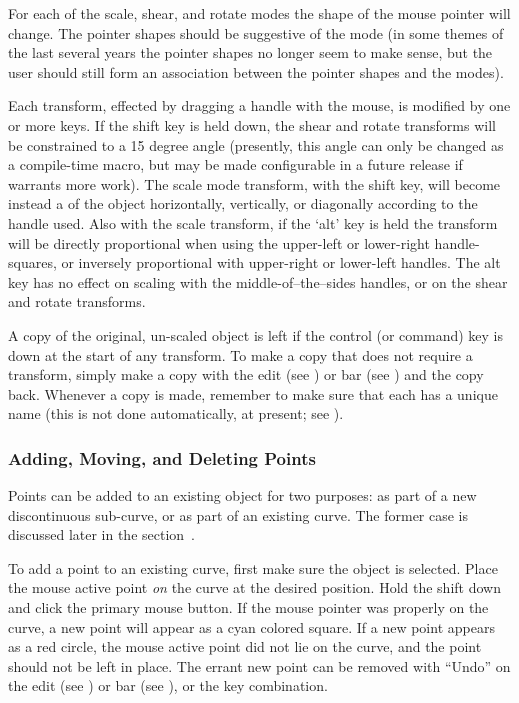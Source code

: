 			For each of the
			scale, shear, and rotate modes the shape of the
			mouse pointer will change. The pointer shapes
			should be suggestive of the mode (in some
			 themes of the last several years the
			pointer shapes no longer seem to make sense, but the
			user should still form an association between the
			pointer shapes and the modes).
			
			Each transform, effected by dragging a handle with the
			mouse, is modified by one or more keys.	If the shift
			key is held down, the shear and rotate transforms
			will be constrained to a 15 degree angle (presently,
			this angle can only be changed as a compile-time
			macro, but may be made configurable
			in a future release if \IXpkg{} warrants more work).
			The scale mode transform, with the shift key, will become
			instead a  of the object horizontally,
			vertically, or diagonally according to the handle
			used. Also with the scale transform, if the `alt'
			key is held the transform will be directly proportional
			when using the upper-left or lower-right handle-squares,
			or inversely proportional with upper-right or
			lower-left handles. The alt key has no effect on
			scaling with the middle-of--the--sides handles, or on
			the shear and rotate transforms.
			
			A copy of the original, un-scaled object is left
			if the control (or command) key is down
			at the start of any transform. To make a copy that
			does not require a transform, simply make a
			 copy with the edit 
			(see ) or  bar
			(see ) and
			 the copy back. Whenever a copy is
			made, remember to make sure that each has a unique
			name (this is not done automatically, at present;
			see ).
			
			\subsubsection{Adding, Moving, and Deleting Points}%
			\label{sssec:add_del_points}
			Points can be added to an existing object
			for two purposes:
			as part of a new discontinuous sub-curve, or as
			part of an existing curve. The former case is
			discussed later in the
			section~.
			
			To add a point to an existing curve, first make sure
			the object is selected. Place the mouse active point
			\emph{on} the curve at the desired position.
			Hold the shift  down and click the
			primary mouse button. If the mouse pointer was
			properly on the curve, a new point will appear as a
			cyan colored square. If a new point appears as
			a red circle, the mouse active point did not lie on the
			curve, and the point should not be left in place.
			The errant new point can be removed with
			``Undo'' on the edit 
			(see ) or  bar
			(see ),
			or the  key combination.
			
